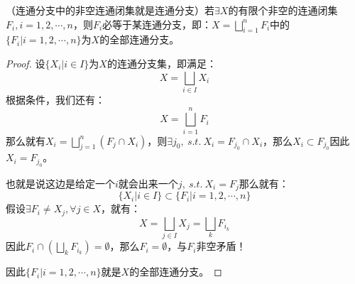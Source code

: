 \documentclass[lang=cn,10pt,device=pad]{elegantbook}
\newcommand{\tl}[1]{\textcolor{myor}{#1}}
\newcommand{\st}{~s.t.~}
\newcommand{\dkh}[1]{\{#1\}}
\begin{document}
\begin{note}
（\tl{连通分支中的非空连通闭集就是连通分支}）若$\exists X$的有限个非空的连通闭集$F_{i},i=1,2,\cdots , n$，则$F_{i}$必等于某连通分支，即：$X = \bigsqcup_{i = 1}^{n}F_{i}$中的$\dkh{F_{i}|i=1,2,\cdots ,n}$为$X$的全部连通分支。

\begin{proof}
	设$\dkh{X_{i}|i\in I}$为$X$的连通分支集，即满足：\begin{equation*}
		X = \bigsqcup_{i\in I}X_{i}
	\end{equation*}
	根据条件，我们还有：
	\begin{equation*}
		X = \bigsqcup_{i=1}^{n}F_{i}
	\end{equation*}
	那么就有$X_{i} = \bigsqcup_{j=1}^{n}(F_{j}\cap X_{i})$，则$\exists j_{0},
	\st X_{i}=F_{j_{0}}\cap X_{i}$，那么$X_{i}\subset F_{j_{0}}$因此$X_{i} = F_{j_{0}}$。
	
	也就是说这边是给定一个$i$就会出来一个$j,\st X_{i} = F_{j}$那么就有：
	\begin{equation*}
		\dkh{X_{i}|i\in I}\subset \dkh{F_{i}|i=1,2,\cdots ,n}
	\end{equation*}假设$\exists F_{i}\neq X_{j} ,\forall j\in X$，就有：
	\begin{equation*}
		X = \bigsqcup_{j\in I}X_{j} = \bigsqcup_{k}F_{i_{k}}
	\end{equation*}
	因此$F_{i}\cap(\bigsqcup_{k}F_{i_{k}}) = \emptyset$，那么$F_{i} = \emptyset$，与$F_{i}$非空矛盾！
	
	因此$\dkh{F_{i}|i=1,2,\cdots,n}$就是$X$的全部连通分支。
\end{proof}	
\end{note}
\end{document}
